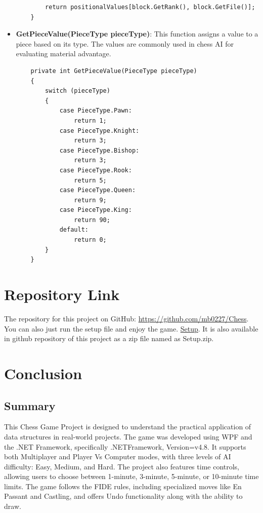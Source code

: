\documentclass[a4paper,12pt]{article}
\begin{document}
\begin{itemize}
\begin{verbatim}
        return positionalValues[block.GetRank(), block.GetFile()];
    }
    \end{verbatim}

    \item \textbf{GetPieceValue(PieceType pieceType)}: 
    This function assigns a value to a piece based on its type. The values are commonly used in chess AI for evaluating material advantage.

    \begin{verbatim}
    private int GetPieceValue(PieceType pieceType)
    {
        switch (pieceType)
        {
            case PieceType.Pawn:
                return 1;
            case PieceType.Knight:
                return 3;
            case PieceType.Bishop:
                return 3;
            case PieceType.Rook:
                return 5;
            case PieceType.Queen:
                return 9;
            case PieceType.King:
                return 90;
            default:
                return 0;
        }
    }
    \end{verbatim}
\end{itemize}

\section{Repository Link}
The repository for this project on GitHub: 
\href{https://github.com/mb0227/Chess}{https://github.com/mb0227/Chess}.
\newline
You can also just run the setup file and enjoy the game.
\href{https://github.com/mb0227/Chess/releases/tag/Chess}{Setup}.
It is also available in github repository of this project as a zip file named as Setup.zip. 

\section{Conclusion}

\subsection{Summary}
This Chess Game Project is designed to understand the practical application of data structures in real-world projects. The game was developed using WPF and the .NET Framework, specifically .NETFramework, Version=v4.8. It supports both Multiplayer and Player Vs Computer modes, with three levels of AI difficulty: Easy, Medium, and Hard. The project also features time controls, allowing users to choose between 1-minute, 3-minute, 5-minute, or 10-minute time limits. The game follows the FIDE rules, including specialized moves like En Passant and Castling, and offers Undo functionality along with the ability to draw. 
\end{document}

